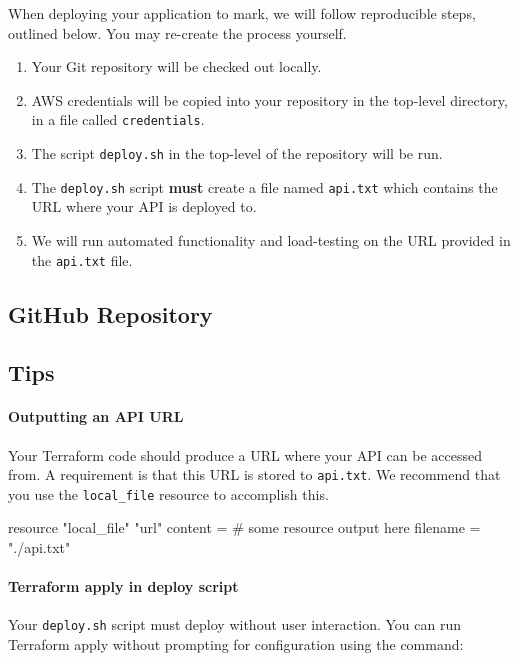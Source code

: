 \documentclass{csse4400}
\begin{document}
When deploying your application to mark,
we will follow reproducible steps, outlined below.
You may re-create the process yourself.

\begin{enumerate}
  \item Your Git repository will be checked out locally.
  \item AWS credentials will be copied into your repository in the top-level directory,
  in a file called \texttt{credentials}.
  \item The script \texttt{deploy.sh} in the top-level of the repository will be run.
  \item The \texttt{deploy.sh} script \textbf{must} create a file named \texttt{api.txt} which contains the URL where your API is deployed to.
  \item We will run automated functionality and load-testing on the URL provided in the \texttt{api.txt} file.
\end{enumerate}

\subsection{GitHub Repository}\label{sec:github}

\subsection{Tips}

\paragraph{Outputting an API URL}
Your Terraform code should produce a URL where your API can be accessed from.
A requirement is that this URL is stored to \texttt{api.txt}.
We recommend that you use the \texttt{local\_file} resource to accomplish this.

\begin{code}[language=terraform]{}
resource "local_file" "url" {
    content  = # some resource output here
    filename = "./api.txt"
}
\end{code}

\paragraph{Terraform apply in deploy script}
Your \texttt{deploy.sh} script must deploy without user interaction.
You can run Terraform apply without prompting for configuration using the command:
\end{document}
